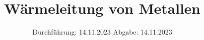 

\subject{V204}
\title{Wärmeleitung von Metallen}
\date{%
  Durchführung: 14.11.2023
  \hspace{3em}
  Abgabe: 14.11.2023
}



\maketitle
\thispagestyle{empty}
\tableofcontents
\newpage






\printbibliography{}


